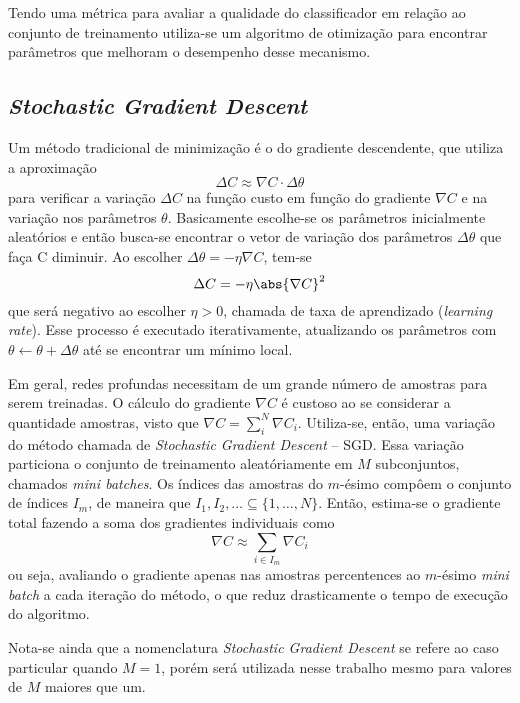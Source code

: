Tendo uma métrica para avaliar a qualidade do classificador em relação ao conjunto de treinamento utiliza-se um algoritmo de otimização para encontrar parâmetros que melhoram o desempenho desse mecanismo.

\subsection{\textit{Stochastic Gradient Descent}}
\label{sec:sgd}
Um método tradicional de minimização é o do gradiente descendente, que utiliza a aproximação
\begin{equation}
\Delta C \approx \nabla C \cdot \Delta \theta
\end{equation}
para verificar a variação $\Delta C$ na função custo em função do gradiente $\nabla C$ e na variação nos parâmetros $\theta$. Basicamente escolhe-se os parâmetros inicialmente aleatórios e então busca-se encontrar o vetor de variação dos parâmetros $\Delta \theta$ que faça C diminuir. Ao escolher $\Delta \theta = -\eta \nabla C$, tem-se
\begin{equation}
\Delta C = -\eta \abs{\nabla C}^2
\end{equation}
que será negativo ao escolher $\eta > 0$, chamada de taxa de aprendizado (\textit{learning rate}). Esse processo é executado iterativamente, atualizando os parâmetros com $\theta \gets \theta + \Delta \theta$ até se encontrar um mínimo local.

Em geral, redes profundas necessitam de um grande número de amostras para serem treinadas. O cálculo do gradiente $\nabla C$ é custoso ao se considerar a quantidade amostras, visto que $\nabla C = \sum_i^N \nabla C_i$. Utiliza-se, então, uma variação do método chamada de \textit{Stochastic Gradient Descent} -- SGD. Essa variação particiona o conjunto de treinamento aleatóriamente em $M$ subconjuntos, chamados \textit{mini batches}. Os índices das amostras do $m$-ésimo  compôem o conjunto de índices $I_m$, de maneira que $I_1, I_2,\dots \subseteq \{1,\dots,N\}$. Então, estima-se o gradiente total fazendo a soma dos gradientes individuais como
\begin{equation}
\nabla C \approx \sum_{i \in I_m} \nabla C_i
\end{equation}
ou seja, avaliando o gradiente apenas nas amostras percentences ao $m$-ésimo \textit{mini batch} a cada iteração do método, o que reduz drasticamente o tempo de execução do algoritmo.

Nota-se ainda que a nomenclatura \textit{Stochastic Gradient Descent} se refere ao caso particular quando $M=1$, porém será utilizada nesse trabalho mesmo para valores de $M$ maiores que um.

